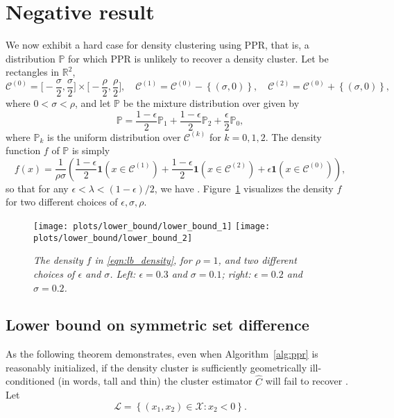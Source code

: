 \documentclass[11pt,twoside]{article}
\theoremstyle{definition}
\newcommand{\Reals}{\mathbb{R}}
\newcommand{\set}[1]{\left\{#1\right\}}
\newcommand{\1}{\mathbf{1}}
\newcommand{\mc}[1]{\mathcal{#1}}
\newcommand{\Pbb}{\mathbb{P}}
\newcommand{\wh}[1]{\widehat{#1}}
\begin{document}
\section{Negative result}
\label{sec:lower_bound}
We now exhibit a hard case for density clustering using PPR, that is, a distribution $\Pbb$ for which PPR is unlikely to recover a density
cluster. Let \smash{$\mc{C}^{(0)}, \mc{C}^{(1)}, \mc{C}^{(2)}$} be rectangles in
$\Reals^2$,    
$$
\mc{C}^{(0)} = \biggl[-\frac{\sigma}{2}, \frac{\sigma}{2}\biggr] \times 
\biggl[-\frac{\rho}{2}, \frac{\rho}{2}\biggr], \quad 
\mc{C}^{(1)} = \mc{C}^{(0)} - \set{(\sigma,0)}, \quad
\mc{C}^{(2)} = \mc{C}^{(0)} + \set{(\sigma,0)},
$$
where $0 < \sigma < \rho$, and let $\Pbb$ be the mixture distribution over
\smash{$\mathcal{X} = \mc{C}^{(0)} \cup \mc{C}^{(1)} \cup \mc{C}^{(2)}$} given by   
$$
\Pbb = \frac{1 - \epsilon}{2} \Pbb_1 + \frac{1 - \epsilon}{2} \Pbb_2 +
\frac{\epsilon}{2} \Pbb_0, 
$$
where $\Pbb_k$ is the uniform distribution over $\mc{C}^{(k)}$ for $k = 0,1,2$.  
The density function $f$ of $\Pbb$ is simply
\begin{equation}
\label{eqn:lb_density}
f(x) = \frac{1}{\rho\sigma}\left(\frac{1 - \epsilon}{2}\1(x \in
\mc{C}^{(1)}) + \frac{1 - \epsilon}{2}\1(x \in \mc{C}^{(2)}) +
\epsilon\1(x \in \mc{C}^{(0)})  \right), 
\end{equation}
so that for any $\epsilon < \lambda < (1 - \epsilon)/2$, we have 
\smash{$\mathbb{C}_f(\lambda) = \set{\mc{C}^{(1)}, \mc{C}^{(2)}}$}. Figure~\ref{fig:hard_case} visualizes the density $f$ for two different choices of $\epsilon,
\sigma, \rho$.  

\begin{figure}[tb]
	\centering
	\texttt{[image: plots/lower\_bound/lower\_bound\_1]}
	\texttt{[image: plots/lower\_bound/lower\_bound\_2]}
	\caption{\it\small The density $f$ in \eqref{eqn:lb_density}, for
		$\rho=1$, and two different choices of $\epsilon$ and $\sigma$. Left:
		$\epsilon = 0.3$ and $\sigma = 0.1$; right: $\epsilon = 0.2$ and 
		$\sigma = 0.2$.} 
	\label{fig:hard_case}
\end{figure}

\subsection{Lower bound on symmetric set difference}
As the following theorem demonstrates, even when Algorithm~\ref{alg:ppr} is
reasonably initialized, if the density cluster \smash{$\mc{C}^{(1)}$} is 
sufficiently geometrically ill-conditioned (in words, tall and thin) the cluster 
estimator $\wh{C}$ will fail to recover \smash{$\mc{C}^{(1)}$}. Let
\begin{equation}
\label{eqn:lower_set}
\mathcal{L} = \set{(x_1,x_2) \in \mathcal{X}: x_2 < 0}.
\end{equation}
\end{document}
